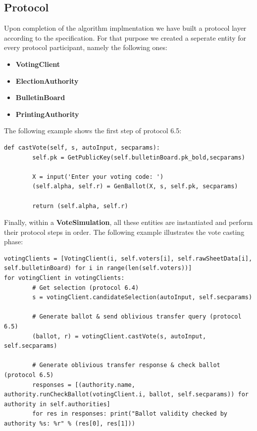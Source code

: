 \subsection{Protocol}
Upon completion of the algorithm implmentation we have built a protocol layer according to the specification. For that purpose we created a seperate entity for every protocol participant, namely the following ones:

\begin{itemize}
	\item \textbf{VotingClient}
	\item \textbf{ElectionAuthority}
	\item \textbf{BulletinBoard}
	\item \textbf{PrintingAuthority}
\end{itemize}

The following example shows the first step of protocol 6.5:

\begin{verbatim}
def castVote(self, s, autoInput, secparams):
		self.pk = GetPublicKey(self.bulletinBoard.pk_bold,secparams)

		X = input('Enter your voting code: ')
		(self.alpha, self.r) = GenBallot(X, s, self.pk, secparams)

		return (self.alpha, self.r)
\end{verbatim}

Finally, within a \textbf{VoteSimulation}, all these entities are instantiated and perform their protocol steps in order. The following example illustrates the vote casting phase:

\begin{verbatim}
votingClients = [VotingClient(i, self.voters[i], self.rawSheetData[i], self.bulletinBoard) for i in range(len(self.voters))]
for votingClient in votingClients:
		# Get selection (protocol 6.4)
		s = votingClient.candidateSelection(autoInput, self.secparams)

		# Generate ballot & send oblivious transfer query (protocol 6.5)
		(ballot, r) = votingClient.castVote(s, autoInput, self.secparams)

		# Generate oblivious transfer response & check ballot (protocol 6.5)
		responses = [(authority.name, authority.runCheckBallot(votingClient.i, ballot, self.secparams)) for authority in self.authorities]
		for res in responses: print("Ballot validity checked by authority %s: %r" % (res[0], res[1]))
\end{verbatim}
